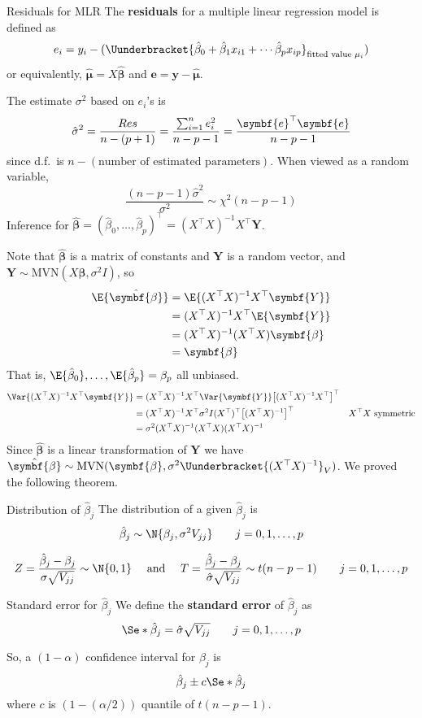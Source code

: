 \begin{Definition}{Residuals for MLR}{}
  The \textbf{residuals} for a multiple linear regression model is defined
  as
  \[ e_i=y_i-(\Uunderbracket{\hat{\beta}_0+\hat{\beta}_1x_{i1}+\cdots\hat{\beta}_p x_{ip}
    }_{\text{fitted value }\mu_i}) \]
  or equivalently, $ \hat{\symbf{\mu}}=X\hat{\symbf{\beta}} $ and
  $ \symbf{e}=\symbf{y}-\hat{\symbf{\mu}} $.
\end{Definition}
The estimate $ \sigma^2 $ based on $ e_i $'s is
\[ \hat{\sigma}^2=\frac{\SS{Res}}{n-(p+1)}=
  \frac{\sum_{i=1}^{n} e_i^2}{n-p-1}=\frac{\symbf{e}^\top\symbf{e}}{n-p-1}  \]
since d.f.\ is $ n-(\text{number of estimated parameters}) $. When viewed
as a random variable,
\[ \frac{(n-p-1)\hat{\sigma}^2}{\sigma^2}\sim \chi^2(n-p-1)  \]
Inference for $ \hat{\symbf{\beta}}=(\hat{\beta}_0,\ldots,\hat{\beta}_p)^\top
  =(X^\top X)^{-1}X^\top \symbf{Y} $.

Note that $ \hat{\symbf{\beta}} $ is a matrix of constants and
$ \symbf{Y} $ is a random vector, and
$ \symbf{Y}\sim \text{MVN}(X\symbf{\beta},\sigma^2 I) $, so
\begin{align*}
  \E{\hat{\symbf{\beta}}}
   & =\E{(X^\top X)^{-1}X^\top \symbf{Y}}    \\
   & =(X^\top X)^{-1}X^\top\E{\symbf{Y}}     \\
   & =(X^\top X)^{-1}(X^\top X)\symbf{\beta} \\
   & =\symbf{\beta}
\end{align*}
That is, $ \E{\hat{\beta}_0},\ldots,\E{\hat{\beta}_p}=\beta_p $
all unbiased.
\begin{align*}
  \Var{(X^\top X)^{-1}X^\top\symbf{Y}}
   & =(X^\top X)^{-1}X^{\top}\Var{\symbf{Y}}\bigl[ (X^\top X)^{-1}X^\top \bigr]^\top                              \\
   & =(X^\top X)^{-1}X^\top \sigma^2 I(X^\top)^\top\bigl[ (X^\top X)^{-1} \bigr]^\top & X^\top X\text{ symmetric} \\
   & =\sigma^2(X^\top X)^{-1}(X^\top X)(X^\top X)^{-1}
\end{align*}
Since $ \hat{\symbf{\beta}} $ is a linear transformation of $ \symbf{Y} $
we have
$ \hat{\symbf{\beta}} \sim \text{MVN}(\symbf{\beta},\sigma^2
  \Uunderbracket{(X^\top X)^{-1}}_{V}) $. We proved the following theorem.
\begin{Theorem}{Distribution of $ \hat{\beta}_j $}{}
  The distribution of a given $ \hat{\beta}_j $ is
  \[ \hat{\beta}_j \sim \N{\beta_j,\sigma^2 V_{jj}}\qquad j=0,1,\ldots,p \]
\end{Theorem}
\[ Z=\frac{\hat{\beta}_j-\beta_j}{\sigma\sqrt{V_{jj}}} \sim \N{0,1}\quad
  \text{ and }\quad
  T=\frac{\hat{\beta}_j-\beta_j}{\hat{\sigma}\sqrt{V_{jj}}} \sim t(n-p-1)\qquad
  j=0,1,\ldots,p   \]
\begin{Definition}{Standard error for $ \hat{\beta}_j $}{}
  We define the \textbf{standard error} of $ \hat{\beta}_j $ as
  \[ \Se*{\hat{\beta}_j}=\hat{\sigma}\sqrt{V_{jj}}\qquad j=0,1,\ldots,p  \]
\end{Definition}
So, a $ (1-\alpha) $ confidence interval for $ \beta_j $
is
\[ \hat{\beta}_j\pm c\Se*{\hat{\beta}_j} \]
where $ c $ is $ (1-(\alpha/2)) $ quantile of $ t(n-p-1) $.

